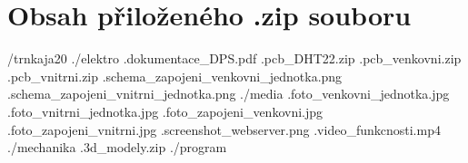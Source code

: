    \chapter{Obsah přiloženého .zip souboru}

        /trnkaja20 \newline
        .\hspace{1cm}/elektro\newline
        .\hspace{2cm}\hbox{dokumentace\_DPS.pdf}\newline
        .\hspace{2cm}\hbox{pcb\_DHT22.zip}\newline
        .\hspace{2cm}\hbox{pcb\_venkovni.zip}\newline
        .\hspace{2cm}\hbox{pcb\_vnitrni.zip}\newline
        .\hspace{2cm}\hbox{schema\_zapojeni\_venkovni\_jednotka.png}\newline
        .\hspace{2cm}\hbox{schema\_zapojeni\_vnitrni\_jednotka.png}\newline
        .\hspace{1cm}/media\newline
        .\hspace{2cm}\hbox{foto\_venkovni\_jednotka.jpg}\newline
        .\hspace{2cm}\hbox{foto\_vnitrni\_jednotka.jpg}\newline
        .\hspace{2cm}\hbox{foto\_zapojeni\_venkovni.jpg}\newline
        .\hspace{2cm}\hbox{foto\_zapojeni\_vnitrni.jpg}\newline
        .\hspace{2cm}\hbox{screenshot\_webserver.png}\newline
        .\hspace{2cm}\hbox{video\_funkcnosti.mp4}\newline
        .\hspace{1cm}/mechanika\newline
        .\hspace{2cm}\hbox{3d\_modely.zip}\newline
        .\hspace{1cm}/program\newline
